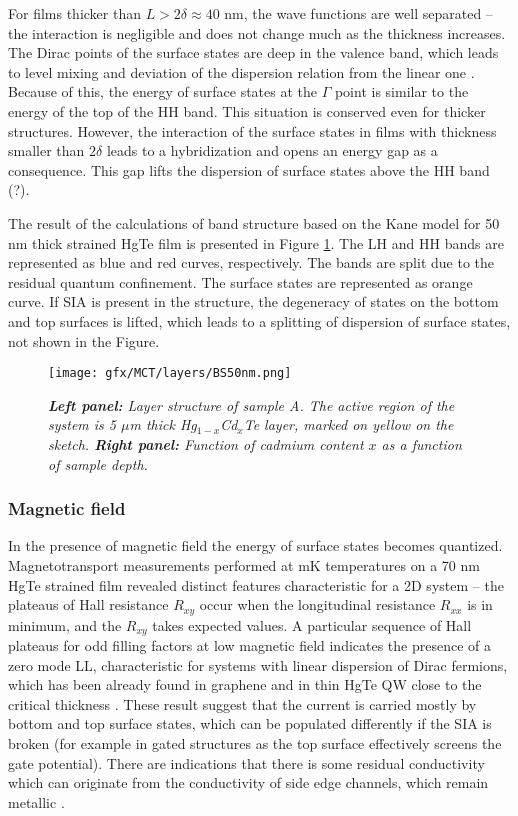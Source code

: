 \documentclass[titlepage,a4paper]{book}
\newcommand{\wciecie}{\quad\phantom{v}}
\begin{document}
For films thicker than $L > 2\delta \approx 40$ nm, the wave functions are well separated -- the interaction is negligible and does not change much as the thickness increases. The Dirac points of the surface states are deep in the valence band, which leads to level mixing and deviation of the dispersion relation from the linear one \cite{Ganichev_MCT_layers}. Because of this, the energy of surface states at the $\Gamma$ point is similar to the energy of the top of the HH band. This situation is conserved even for thicker structures. However, the interaction of the surface states in films with thickness smaller than $2\delta$ leads to a hybridization and opens an energy gap as a consequence. This gap lifts the dispersion of surface states above the HH band (?).

The result of the calculations of band structure based on the Kane model for 50 nm thick strained HgTe film is presented in Figure \ref{fig:BS50nm}. The LH and HH bands are represented as blue and red curves, respectively. The bands are split due to the residual quantum confinement. The surface states are represented as orange curve. If SIA is present in the structure, the degeneracy of states on the bottom and top surfaces is lifted, which leads to a splitting of dispersion of surface states, not shown in the Figure.   

\begin{figure}[H]
	\centering
	\texttt{[image: gfx/MCT/layers/BS50nm.png]}
	\vspace{-10pt}
	\caption{\textit{\textbf{Left panel:} Layer structure of sample A. The active region of the system is 5 $\mu$m thick Hg$_{1-x}$Cd$_x$Te layer, marked on yellow on the sketch. \textbf{Right panel:} Function of cadmium content $x$ as a function of sample depth.}}
	\label{fig:BS50nm}
\end{figure} 

\subsubsection{Magnetic field}
\wciecie
In the presence of magnetic field the energy of surface states becomes quantized. Magnetotransport measurements performed at mK temperatures \cite{Brune_State2} on a 70 nm HgTe strained film revealed distinct features characteristic for a 2D system -- the plateaus of Hall resistance $R_{xy}$ occur when the longitudinal resistance $R_{xx}$ is in minimum, and the $R_{xy}$ takes expected values. A particular sequence of Hall plateaus for odd filling factors at low magnetic field indicates the presence of a zero mode LL, characteristic for systems with linear dispersion of Dirac fermions, which has been already found in graphene \cite{Castro_graphene} and in thin HgTe QW close to the critical thickness \cite{Zholudev_MCT_QW}. These result suggest that the current is carried mostly by bottom and top surface states, which can be populated differently if the SIA is broken (for example in gated structures as the top surface effectively screens the gate potential). There are indications that there is some residual conductivity which can originate from the conductivity of side edge channels, which remain metallic \cite{Chu_MCT_layers}. 
\end{document}
